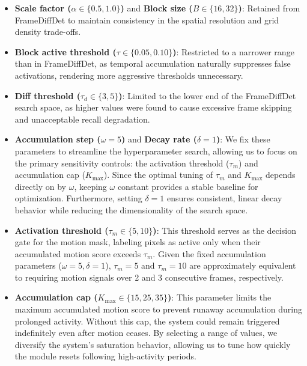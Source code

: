 \documentclass[
  10pt,
]{article}
\begin{document}
\begin{itemize}
\item
  \textbf{Scale factor (\(\alpha \in \{0.5, 1.0\}\))} and \textbf{Block
  size (\(B \in \{16, 32\}\))}: Retained from FrameDiffDet to maintain
  consistency in the spatial resolution and grid density trade-offs.
\item
  \textbf{Block active threshold (\(\tau \in \{0.05, 0.10\}\))}:
  Restricted to a narrower range than in FrameDiffDet, as temporal
  accumulation naturally suppresses false activations, rendering more
  aggressive thresholds unnecessary.
\item
  \textbf{Diff threshold (\(\tau_d \in \{3, 5\}\))}: Limited to the
  lower end of the FrameDiffDet search space, as higher values were
  found to cause excessive frame skipping and unacceptable recall
  degradation.
\item
  \textbf{Accumulation step (\(\omega=5\))} and \textbf{Decay rate
  (\(\delta=1\))}: We fix these parameters to streamline the
  hyperparameter search, allowing us to focus on the primary sensitivity
  controls: the activation threshold (\(\tau_m\)) and accumulation cap
  (\(K_{\max}\)). Since the optimal tuning of \(\tau_m\) and
  \(K_{\max}\) depends directly on by \(\omega\), keeping \(\omega\)
  constant provides a stable baseline for optimization. Furthermore,
  setting \(\delta=1\) ensures consistent, linear decay behavior while
  reducing the dimensionality of the search space.
\item
  \textbf{Activation threshold (\(\tau_m \in \{5, 10\}\))}: This
  threshold serves as the decision gate for the motion mask, labeling
  pixels as active only when their accumulated motion score exceeds
  \(\tau_m\). Given the fixed accumulation parameters
  (\(\omega=5, \delta=1\)), \(\tau_m=5\) and \(\tau_m=10\) are
  approximately equivalent to requiring motion signals over 2 and 3
  consecutive frames, respectively.
\item
  \textbf{Accumulation cap (\(K_{\max} \in \{15, 25, 35\}\))}: This
  parameter limits the maximum accumulated motion score to prevent
  runaway accumulation during prolonged activity. Without this cap, the
  system could remain triggered indefinitely even after motion ceases.
  By selecting a range of values, we diversify the system's saturation
  behavior, allowing us to tune how quickly the module resets following
  high-activity periods.
\end{itemize}
\end{document}
